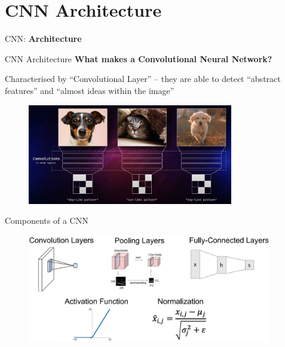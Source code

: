 \section{CNN Architecture}
\begin{frame}{}
    \LARGE CNN: \textbf{Architecture}
\end{frame}

\begin{frame}{CNN Architecture}
    \textbf{What makes a Convolutional Neural Network?}
    
    Characterised by “Convolutional Layer” – they are able to detect “abstract features” and “almost ideas within the image”

    \newline

    \begin{figure}
    \centering
    \includegraphics[width=0.8\textwidth,height=0.75\textheight,keepaspectratio]{images/cnn/what-makes-cnn.png}
    \end{figure}
\end{frame}

\begin{frame}{Components of a CNN}
    \begin{figure}
    \centering
    \includegraphics[width=0.95\textwidth,height=0.95\textheight,keepaspectratio]{images/cnn/cnn-components.png}
    \end{figure}
\end{frame}